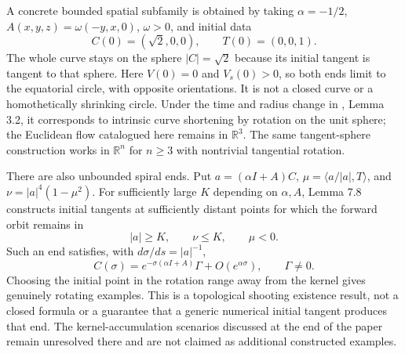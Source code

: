 \begin{example}
A concrete bounded spatial subfamily is obtained by taking $\alpha=-1/2$, $A(x,y,z)=\omega(-y,x,0)$, $\omega>0$, and initial data
\[
 C(0)=(\sqrt2,0,0),\qquad T(0)=(0,0,1).
\]
The whole curve stays on the sphere $|C|=\sqrt2$ because its initial tangent is tangent to that sphere. Here $V(0)=0$ and $V_s(0)>0$, so both ends limit to the equatorial circle, with opposite orientations. It is not a closed curve or a homothetically shrinking circle. Under the time and radius change in \cite{CatAAAW13}, Lemma 3.2, it corresponds to intrinsic curve shortening by rotation on the unit sphere; the Euclidean flow catalogued here remains in $\mathbb R^3$. The same tangent-sphere construction works in $\mathbb R^n$ for $n\geq3$ with nontrivial tangential rotation.

There are also unbounded spiral ends. Put $a=(\alpha I+A)C$, $\mu=\langle a/|a|,T\rangle$, and $\nu=|a|^4(1-\mu^2)$. For sufficiently large $K$ depending on $\alpha,A$, Lemma 7.8 constructs initial tangents at sufficiently distant points for which the forward orbit remains in
\[
 |a|\geq K,\qquad \nu\leq K,\qquad \mu<0.
\]
Such an end satisfies, with $d\sigma/ds=|a|^{-1}$,
\[
 C(\sigma)=e^{-\sigma(\alpha I+A)}\Gamma+O(e^{\alpha\sigma}),
 \qquad \Gamma\ne0.
\]
Choosing the initial point in the rotation range away from the kernel gives genuinely rotating examples. This is a topological shooting existence result, not a closed formula or a guarantee that a generic numerical initial tangent produces that end. The kernel-accumulation scenarios discussed at the end of the paper remain unresolved there and are not claimed as additional constructed examples.


\end{example}
